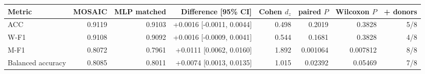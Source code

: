 \begin{tabular}{lrrrrrrr}
\toprule
Metric & MOSAIC & MLP matched & Difference [95\% CI] & Cohen $d_z$ & paired $P$ & Wilcoxon $P$ & + donors \\
\midrule
ACC & 0.9119 & 0.9103 & +0.0016 [-0.0011, 0.0044] & 0.498 & 0.2019 & 0.3828 & 5/8 \\
W-F1 & 0.9108 & 0.9092 & +0.0016 [-0.0009, 0.0041] & 0.544 & 0.1681 & 0.3828 & 4/8 \\
M-F1 & 0.8072 & 0.7961 & +0.0111 [0.0062, 0.0160] & 1.892 & 0.001064 & 0.007812 & 8/8 \\
Balanced accuracy & 0.8085 & 0.8011 & +0.0074 [0.0013, 0.0135] & 1.015 & 0.02392 & 0.05469 & 7/8 \\
\bottomrule
\end{tabular}
